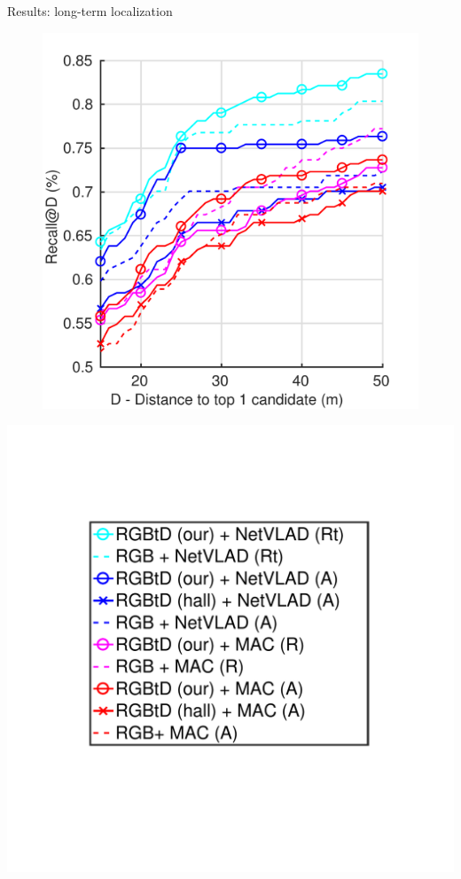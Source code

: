 \begin{frame}{Results: long-term localization}
	\begin{minipage}{0.49\linewidth}
		\centering
		\begin{figure}
			\includegraphics[width=0.9\linewidth]{vect/res/lt}
		\end{figure}
	\end{minipage}\hfill
	\begin{minipage}{0.49\linewidth}
		\begin{minipage}{0.49\linewidth}
			\includegraphics[trim={90 140 95 100},clip,width=\linewidth]{vect/res/legend}		

\end{minipage}
\end{minipage}
\end{frame}
